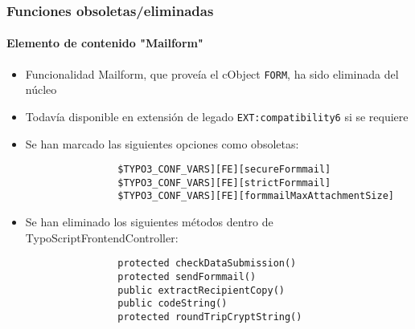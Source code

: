 
\begin{frame}[fragile]
	\frametitle{Funciones obsoletas/eliminadas}
	\framesubtitle{Elemento de contenido "Mailform"}

	\begin{itemize}

		\item Funcionalidad Mailform, que proveía el cObject \texttt{FORM}, ha sido
			eliminada del núcleo

		\item Todavía disponible en extensión de legado \texttt{EXT:compatibility6} si se requiere

		\item Se han marcado las siguientes opciones como obsoletas:

			\begin{lstlisting}
				$TYPO3_CONF_VARS][FE][secureFormmail]
				$TYPO3_CONF_VARS][FE][strictFormmail]
				$TYPO3_CONF_VARS][FE][formmailMaxAttachmentSize]
			\end{lstlisting}

		\item Se han eliminado los siguientes métodos dentro de TypoScriptFrontendController:

			\begin{lstlisting}
				protected checkDataSubmission()
				protected sendFormmail()
				public extractRecipientCopy()
				public codeString()
				protected roundTripCryptString()
			\end{lstlisting}

	\end{itemize}

\end{frame}


